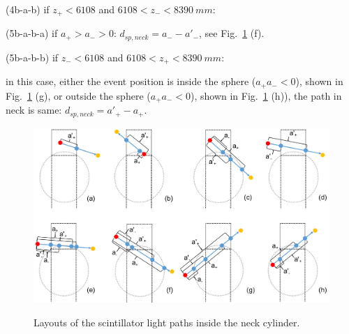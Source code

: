 \begin{algorithm}
	\hspace{10mm}(4b-a-b) if $z_+<6108$ and $6108<z_-<8390~mm$:
	
	\hspace{12mm}(5b-a-b-a) if $a_+>a_->0$: $d_{sp,neck}=a_--a'_-$, see Fig.~\ref{lightpath_scintNeck} (f).
	
	\hspace{12mm}(5b-a-b-b) if $z_-<6108$ and $6108<z_+<8390~mm$:
	
	\hspace{14mm}in this case, either the event position is inside the sphere ($a_+a_-<0$), shown in Fig.~\ref{lightpath_scintNeck} (g), or outside the sphere ($a_+a_-<0$), shown in Fig.~\ref{lightpath_scintNeck} (h)), the path in neck is same: $d_{sp,neck}=a'_+ - a_+$.
\end{algorithm}


\begin{figure}
	\centering
	{\includegraphics[width=130mm]{scintpathNeck.png}}
	\caption{Layouts of the scintillator light paths inside the neck cylinder.}\label{lightpath_scintNeck}
\end{figure}

